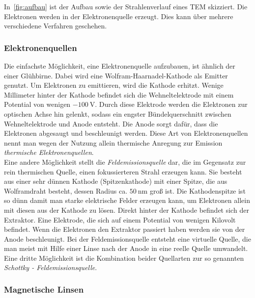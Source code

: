 \documentclass[slug=TEM, room=IFW, supervisor=?, coursedate=23.\ 01.\ 2020]{../../Lab_Report_LaTeX/lab_report}
\begin{document}
In~\ref{fig:aufbau} ist der Aufbau sowie der Strahlenverlauf eines TEM skizziert. Die Elektronen
werden in der Elektronenquelle erzeugt. Dies kann über mehrere verschiedene Verfahren geschehen.

\subsubsection{Elektronenquellen}
\label{sec:equellen}

Die einfachste Möglichkeit, eine Elektronenquelle aufzubauen, ist ähnlich der einer Glühbirne.
Dabei wird eine Wolfram-Haarnadel-Kathode als Emitter genutzt. Um Elektronen zu emittieren, wird
die Kathode erhitzt. Wenige Millimeter hinter der Kathode befindet sich die Wehneltelektrode mit
einem Potential von wenigen \(\SI{-100}{\volt}\). Durch diese Elektrode werden die Elektronen zur
optischen Achse hin gelenkt, sodass ein engster Bündelquerschnitt zwischen Wehneltelektrode und
Anode entsteht. Die Anode sorgt dafür, dass die Elektronen abgesaugt und beschleunigt werden.
Diese Art von Elektronenquellen nennt man wegen der Nutzung allein thermische Anregung zur 
Emission \emph{thermische Elektronenquellen}.\\

Eine andere Möglichkeit stellt die \emph{Feldemissionsquelle} dar, die im Gegensatz zur
rein thermischen Quelle, einen fokussierteren Strahl erzeugen kann. Sie besteht aus einer
sehr dünnen Kathode (Spitzenkathode) mit einer Spitze, die aus Wolframdraht besteht, dessen
Radius ca. \(\SI{50}{\nano\metre}\) groß ist. Die Kathodenspitze ist so dünn damit man starke
elektrische Felder erzeugen kann, um Elektronen allein mit diesen aus der Kathode zu lösen.
Direkt hinter der Kathode befindet sich der Extraktor. Eine Elektrode, die sich auf einem 
Potential von wenigen Kilovolt befindet. Wenn die Elektronen den Extraktor passiert haben werden
sie von der Anode beschleunigt. Bei der Feldemissionsquelle entsteht eine virtuelle Quelle,
die man meist mit Hilfe einer Linse nach der Anode in eine reelle Quelle umwandelt.\\

Eine dritte Möglichkeit ist die Kombination beider Quellarten zur so genannten
\emph{Schottky - Feldemissionsquelle}.

\subsubsection{Magnetische Linsen}
\label{sec:linsen}
\end{document}
